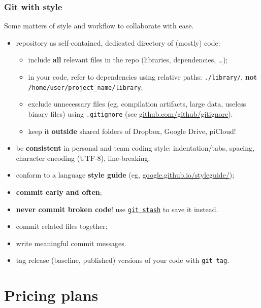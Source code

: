 \documentclass[10pt,svgnames]{beamer}
\begin{document}
\begin{frame}
\label{style}
\frametitle{Git with style}

Some matters of style and workflow to collaborate with ease.

\begin{itemize}[<+->]
\item repository as self-contained, dedicated directory of (mostly) code:
\begin{itemize}
  \item include \textbf{all} relevant files in the repo (libraries, dependencies, \ldots);
  \item in your code, refer to dependencies using relative paths: \lstinline{./library/}, \textbf{not} \lstinline{/home/user/project_name/library};
  \item exclude unnecessary files (eg, compilation artifacts, large data, useless binary files) using \texttt{.gitignore} (see \href{https://github.com/github/gitignore}{github.com/github/gitignore}).
  \item keep it \textbf{outside} shared folders of Dropbox, Google Drive, piCloud!
\end{itemize}
\item be \textbf{consistent} in personal and team coding style: indentation/tabs, spacing, character encoding (UTF-8), line-breaking.
\item conform to a language \textbf{style guide} (eg, \href{https://google.github.io/styleguide/}{google.github.io/styleguide/});
\item \textbf{commit early and often};
\item \textbf{never commit broken code}! use \href{https://git-scm.com/book/it/v2/Git-Tools-Stashing-and-Cleaning}{\lstinline{git stash}} to save it instead.
\item commit related files together;
\item write meaningful commit messages.
\item tag release (baseline, published) versions of your code with \lstinline{git tag}.
\end{itemize}

\end{frame}


\section{Pricing plans}
\end{document}
